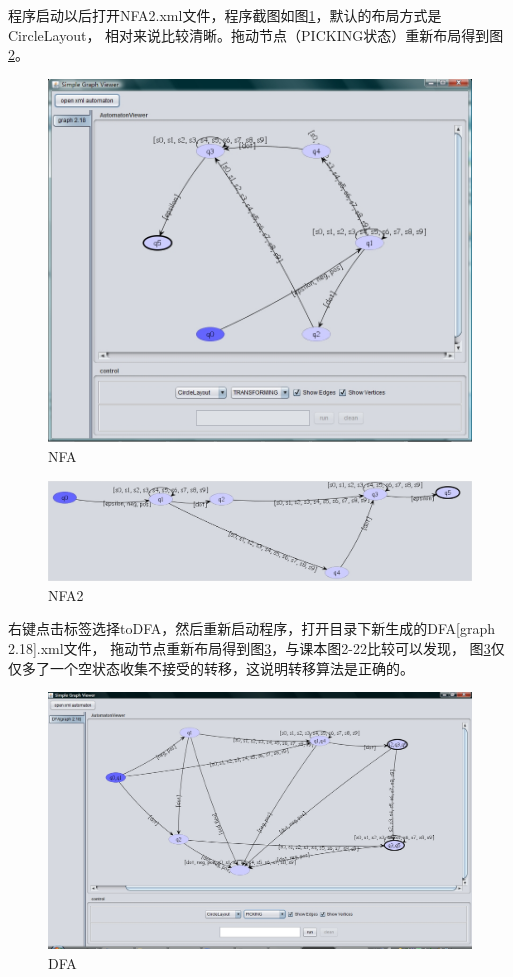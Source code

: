 \documentclass[12pt,a4paper]{article}
\begin{document}
\begin{CJK}{UTF8}{song}
    程序启动以后打开NFA2.xml文件，程序截图如图\ref{fig:NFA}，默认的布局方式是CircleLayout，
    相对来说比较清晰。拖动节点（PICKING状态）重新布局得到图\ref{fig:NFA2}。
    \begin{figure}[htbp]
    \centering
    \includegraphics[scale=.3]{NFA}
    \caption{NFA}
    \label{fig:NFA}
    \end{figure}
    \begin{figure}[htbp]
    \centering
    \includegraphics[scale=.35]{NFA2}
    \caption{NFA2}
    \label{fig:NFA2}
    \end{figure}
    
    右键点击标签选择toDFA，然后重新启动程序，打开目录下新生成的DFA[graph 2.18].xml文件，
    拖动节点重新布局得到图\ref{fig:DFA}，与课本图2-22比较可以发现，
    图\ref{fig:DFA}仅仅多了一个空状态收集不接受的转移，这说明转移算法是正确的。
    \begin{figure}[htbp]
    \centering
    \includegraphics[scale=.3]{DFA}
    \caption{DFA}
    \label{fig:DFA}
    \end{figure}
    

\end{CJK}
\end{document}
